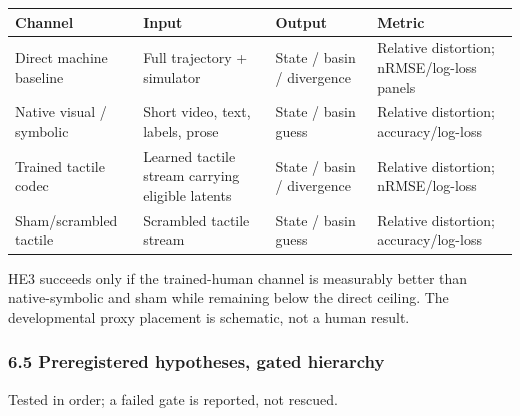 \documentclass[
  11pt,
]{article}
\newcounter{none} %
\begin{document}
{\def\LTcaptype{none} %
\begin{longtable}[]{@{}
  >{\raggedright\arraybackslash}p{}
  >{\raggedright\arraybackslash}p{}
  >{\raggedright\arraybackslash}p{}
  >{\raggedright\arraybackslash}p{}@{}}
\toprule\noalign{}
\begin{minipage}[b]{\linewidth}\raggedright
Channel
\end{minipage} &
\begin{minipage}[b]{\linewidth}\raggedright
Input
\end{minipage} &
\begin{minipage}[b]{\linewidth}\raggedright
Output
\end{minipage} &
\begin{minipage}[b]{\linewidth}\raggedright
Metric
\end{minipage} \\
\midrule\noalign{}
\endhead
\bottomrule\noalign{}
\endlastfoot
Direct machine baseline & Full trajectory +
simulator & State / basin / divergence &
Relative distortion; nRMSE/log-loss panels \\
Native visual / symbolic & Short video, text,
labels, prose & State / basin guess & Relative
distortion; accuracy/log-loss \\
Trained tactile codec & Learned tactile stream
carrying eligible latents & State / basin /
divergence & Relative distortion;
nRMSE/log-loss \\
Sham/scrambled tactile & Scrambled tactile
stream & State / basin guess & Relative
distortion; accuracy/log-loss \\
\end{longtable}
}

HE3 succeeds only if the trained-human channel
is measurably better than native-symbolic and
sham while remaining below the direct ceiling.
The developmental proxy placement is schematic,
not a human result.

\subsubsection{6.5 Preregistered hypotheses,
gated
hierarchy}\label{preregistered-hypotheses-gated-hierarchy}

Tested in order; a failed gate is reported, not
rescued.
\end{document}
